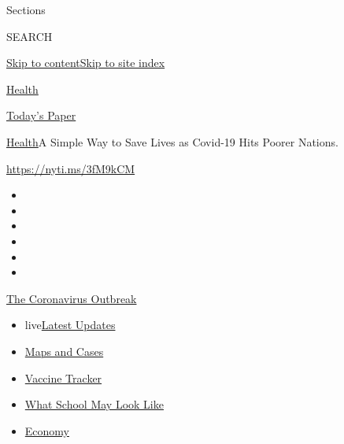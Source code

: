 Sections

SEARCH

\protect\hyperlink{site-content}{Skip to
content}\protect\hyperlink{site-index}{Skip to site index}

\href{https://www.nytimes3xbfgragh.onion/section/health}{Health}

\href{https://myaccount.nytimes3xbfgragh.onion/auth/login?response_type=cookie\&client_id=vi}{}

\href{https://www.nytimes3xbfgragh.onion/section/todayspaper}{Today's
Paper}

\href{/section/health}{Health}\textbar{}A Simple Way to Save Lives as
Covid-19 Hits Poorer Nations.

\url{https://nyti.ms/3fM9kCM}

\begin{itemize}
\item
\item
\item
\item
\item
\item
\end{itemize}

\href{https://www.nytimes3xbfgragh.onion/news-event/coronavirus?action=click\&pgtype=Article\&state=default\&region=TOP_BANNER\&context=storylines_menu}{The
Coronavirus Outbreak}

\begin{itemize}
\tightlist
\item
  live\href{https://www.nytimes3xbfgragh.onion/2020/08/01/world/coronavirus-covid-19.html?action=click\&pgtype=Article\&state=default\&region=TOP_BANNER\&context=storylines_menu}{Latest
  Updates}
\item
  \href{https://www.nytimes3xbfgragh.onion/interactive/2020/us/coronavirus-us-cases.html?action=click\&pgtype=Article\&state=default\&region=TOP_BANNER\&context=storylines_menu}{Maps
  and Cases}
\item
  \href{https://www.nytimes3xbfgragh.onion/interactive/2020/science/coronavirus-vaccine-tracker.html?action=click\&pgtype=Article\&state=default\&region=TOP_BANNER\&context=storylines_menu}{Vaccine
  Tracker}
\item
  \href{https://www.nytimes3xbfgragh.onion/interactive/2020/07/29/us/schools-reopening-coronavirus.html?action=click\&pgtype=Article\&state=default\&region=TOP_BANNER\&context=storylines_menu}{What
  School May Look Like}
\item
  \href{https://www.nytimes3xbfgragh.onion/live/2020/07/31/business/stock-market-today-coronavirus?action=click\&pgtype=Article\&state=default\&region=TOP_BANNER\&context=storylines_menu}{Economy}
\end{itemize}

